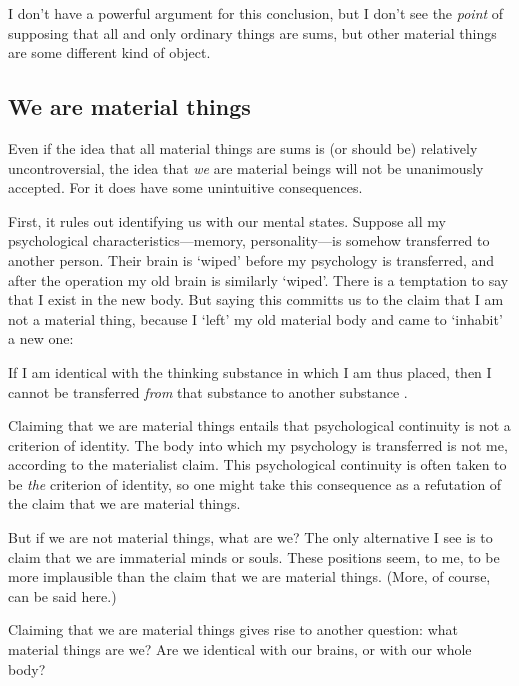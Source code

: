 \documentclass[11pt]{article}
\newenvironment{squote}{%
\begin{spacing}{1}
\begin{list}{}{%
\setlength{\labelwidth}{0pt}%
\rightmargin\leftmargin%
}
\item\relax
}{%
\end{list}%
\end{spacing}
}
\begin{document}
\begin{spacing}{1.5}
I don't have a powerful argument for this conclusion, but I don't see
the {\em point} of supposing that all and only ordinary things are
sums, but other material things are some different kind of object.


\subsection{We are material things}
\label{material-beings}
Even if the idea that all material things are sums is (or should be)
relatively uncontroversial, the idea that {\em we} are material beings
will not be unanimously accepted.  For it does have some unintuitive
consequences.  

First, it rules out identifying us with our mental states.  Suppose
all my psychological characteristics---memory, personality---is
somehow transferred to another person.  Their brain is `wiped' before
my psychology is transferred, and after the operation my old brain is
similarly `wiped'.  There is a temptation to say that I exist in the
new body.  But saying this committs us to the claim that I am not a
material thing, because I `left' my old material body and came to
`inhabit' a new one:

\begin{squote}
 If I am identical with the thinking substance in which I am thus
 placed, then I cannot be transferred {\em from} that substance to
 another substance \citeyearpar[107]{chisholm1979}.
\end{squote}

Claiming that we are material things entails that psychological
continuity is not a criterion of identity.  The body into which my
psychology is transferred is not me, according to the materialist
claim.  This psychological continuity is often taken to be {\em the}
criterion of identity, so one might take this consequence as a
refutation of the claim that we are material things.

But if we are not material things, what are we?  The only alternative
I see is to claim that we are immaterial minds or souls.  These
positions seem, to me, to be more implausible than the claim that we
are material things.  (More, of course, can be said here.)

Claiming that we are material things gives rise to another question:
what material things are we?  Are we identical with our brains, or
with our whole body?


\end{spacing}
\end{document}
